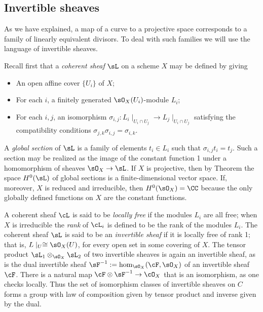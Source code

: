 \subsection{Invertible sheaves}\label{Invertible sheaves}

As we have explained, a map of a curve to a projective space corresponds to a family of linearly equivalent divisors.
To deal with such families we will use the language of invertible sheaves. 

Recall first that a \emph{coherent sheaf} $\sL$ on a scheme $X$ may be defined by
giving 
\begin{itemize}
 \item An open affine cover $\{U_{i}\}$ of $X$; 
 \item For each $i$, a finitely generated $\sO_{X}(U_{i})$-module $L_{i}$;
 \item For each $i,j$, an isomorphism $\sigma_{i,j}: L_{i}\mid_{U_{i}\cap U_{j}} \to L_{j}\mid_{U_{i}\cap U_{j}}$
 satisfying the compatibility conditions $\sigma_{j,k}\sigma_{i,j} = \sigma_{i,k}$. 
 \end{itemize}

A \emph{global section} of $\sL$ is a family of elements $t_{i}\in L_{i}$ such that 
$\sigma_{i,j} t_{i} = t_{j}$. Such a section may be realized as the image of the constant function 1 under
a homomorphism of sheaves $\sO_{X} \to \sL$. If $X$ is projective, then 
by Theorem \cite[Thm III.5.2]{H} the space $H^{0}(\sL)$  of global sections is
a finite-dimensional vector space. If, moreover, $X$ is reduced and irreducible, then $H^{0}(\sO_{X}) = \CC$ because the only globally defined
functions on $X$ are the constant functions.

A coherent sheaf $\cL$ is said to be \emph{locally free} if the modules $L_i$ are all free; when $X$ is irreducible the \emph{rank} of $\cL_i$ is defined to be the rank of the modules $L_i$.
The coherent sheaf $\sL$ is said to be an \emph{invertible sheaf} if it is locally free of rank 1; that is, $L\mid_U \cong \sO_X(U)$,
for every open set in some covering of $X$. The tensor product  $\sL_1\otimes_{\sO_X}\sL_2$ of two invertible sheaves is  again an invertible sheaf, as is the dual invertible sheaf $\sF^{-1} := \hom_{\sO_X}(\cF,\sO_X)$ of an invertible sheaf $\cF$. There is a natural map
$\cF \otimes \sF^{-1} \to \cO_X$ that is an isomorphism, as one checks locally. Thus the set of isomorphism classes of invertible sheaves on $C$ forms a group with law of composition given by tensor product and inverse given by the dual.

